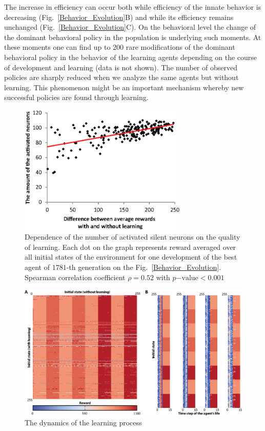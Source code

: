 \documentclass[letterpaper]{article}
\begin{document}
The increase in efficiency can occur both while efficiency of the innate behavior is decreasing (Fig.~\ref{Behavior_Evolution}B) and while its efficiency remains unchanged (Fig.~\ref{Behavior_Evolution}C). On the behavioral level the change of the dominant behavioral policy in the population is underlying such moments. At these moments one can find up to $200$ rare modifications of the dominant behavioral policy in the behavior of the learning agents depending on the course of development and learning (data is not shown). The number of observed policies are sharply reduced when we analyze the same agents but without learning. This phenomenon might be an important mechanism whereby new successful policies are found through learning.

\begin{figure}[!b]
\begin{center}
\includegraphics[width=8cm]{Fig5.eps}
\caption{Dependence of the number of activated silent neurons on the quality of learning. Each dot on the graph represents reward averaged over all initial states of the environment for one development of the best agent of $1781$-th generation on the Fig.~\ref{Behavior_Evolution}. Spearman correlation coefficient $\rho=0.52$ with $p\mathrm{-value}<0.001$}
\label{Neurons_Learning_Correlation}
\end{center}
\end{figure}

\begin{figure}[!t]
\begin{center}
\includegraphics[width=16cm]{Fig6.eps}
\caption{The dynamics of the learning process}
\label{Learning_Process}
\end{center}
\end{figure}
\end{document}
